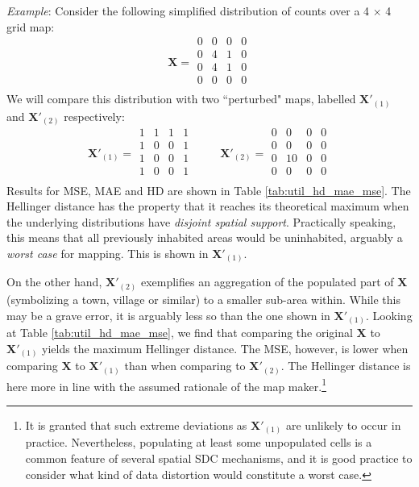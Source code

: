 \begin{tcolorbox}[breakable]
\emph{Example}:
Consider the following simplified distribution of counts over a 4 $\times$ 4 grid map:
\[ 
\mathbf{X} = \begin{matrix} 
0 & 0 & 0 & 0 \\
0 & 4 & 1 & 0 \\
0 & 4 & 1 & 0 \\
0 & 0 & 0 & 0 \\
\end{matrix}
\]
We will compare this distribution with two ``perturbed" maps, labelled $\mathbf{X}'_{(1)}$ and $\mathbf{X}'_{(2)}$ respectively:
\[
\mathbf{X}'_{(1)} =
\begin{matrix} 
1 & 1 & 1 & 1 \\
1 & 0 & 0 & 1 \\
1 & 0 & 0 & 1 \\
1 & 0 & 0 & 1 \\
\end{matrix}\hspace{1cm}
\mathbf{X}'_{(2)} =
\begin{matrix} 
0 & 0  & 0 & 0 \\
0 & 0  & 0 & 0 \\
0 & 10 & 0 & 0 \\
0 & 0  & 0 & 0 \\
\end{matrix} 
\]
Results for MSE, MAE and HD are shown in Table \ref{tab:util_hd_mae_mse}.
The Hellinger distance has the property that it reaches its theoretical maximum when the underlying distributions have \textit{disjoint spatial support}. Practically speaking, this means that all previously inhabited areas would be uninhabited, arguably a \emph{worst case} for mapping. This is shown in $\mathbf{X}'_{(1)}$.

On the other hand, $\mathbf{X}'_{(2)}$ exemplifies an aggregation of the populated part of $\mathbf{X}$ (symbolizing a town, village or similar) to a smaller sub-area within. While this may be a grave error, it is arguably less so than the one shown in $\mathbf{X}'_{(1)}$. 
Looking at Table \ref{tab:util_hd_mae_mse}, we find that comparing the original $\mathbf{X}$ to $\mathbf{X}'_{(1)}$ yields the maximum Hellinger distance. The MSE, however, is lower when comparing $\mathbf{X}$ to $\mathbf{X}'_{(1)}$ than when comparing to $\mathbf{X}'_{(2)}$. The Hellinger distance is here more in line with the assumed rationale of the map maker.\footnote{
    It is granted that such extreme deviations as $\mathbf{X}'_{(1)}$ are unlikely to occur in practice. Nevertheless, populating at least some unpopulated cells is a common feature of several spatial SDC mechanisms, and it is good practice to consider what kind of data distortion would constitute a worst case.}\\


\end{tcolorbox}
